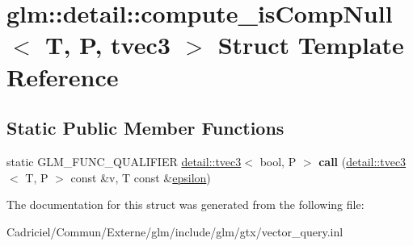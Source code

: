 \hypertarget{structglm_1_1detail_1_1compute__is_comp_null_3_01_t_00_01_p_00_01tvec3_01_4}{}\section{glm\+:\+:detail\+:\+:compute\+\_\+is\+Comp\+Null$<$ T, P, tvec3 $>$ Struct Template Reference}
\label{structglm_1_1detail_1_1compute__is_comp_null_3_01_t_00_01_p_00_01tvec3_01_4}
\subsection*{Static Public Member Functions}
\begin{DoxyCompactItemize}
\item 
static G\+L\+M\+\_\+\+F\+U\+N\+C\+\_\+\+Q\+U\+A\+L\+I\+F\+I\+ER \hyperlink{structglm_1_1detail_1_1tvec3}{detail\+::tvec3}$<$ bool, P $>$ {\bfseries call} (\hyperlink{structglm_1_1detail_1_1tvec3}{detail\+::tvec3}$<$ T, P $>$ const \&v, T const \&\hyperlink{group__gtc__constants_gacb41049b8d22c8aa90e362b96c524feb}{epsilon})\hypertarget{structglm_1_1detail_1_1compute__is_comp_null_3_01_t_00_01_p_00_01tvec3_01_4_a0a45c3ab9debff20dae1f53392500840}{}\label{structglm_1_1detail_1_1compute__is_comp_null_3_01_t_00_01_p_00_01tvec3_01_4_a0a45c3ab9debff20dae1f53392500840}

\end{DoxyCompactItemize}


The documentation for this struct was generated from the following file\+:\begin{DoxyCompactItemize}
\item 
Cadriciel/\+Commun/\+Externe/glm/include/glm/gtx/vector\+\_\+query.\+inl\end{DoxyCompactItemize}
